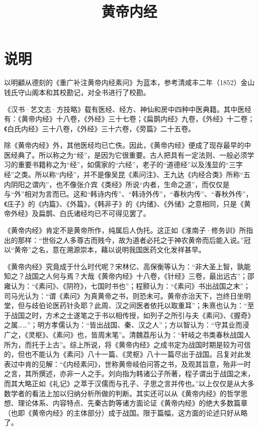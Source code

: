 \documentclass[a4paper,12pt,UTF8,twoside]{ctexbook}
\title{\heiti\zihao{0} 黄帝内经}
\date{}
\begin{document}
\maketitle

\tableofcontents

\frontmatter

\chapter{说明}
以明顧从德刻的《重广补注黄帝内经素问》为蓝本，参考清咸丰二年（1852）金山钱氏守山阁本和其校勘记，对全书进行了校勘。

《汉书·艺文志·方技略》载有医经、经方、神仙和房中四种中医典籍。其中医经有：《黄帝内经》十八卷，《外经》三十七卷；《扁鹊内经》九卷，《外经》十二卷；《白氏内经》三十八卷，《外经》三十六卷，《旁篇》二十五卷。

除《黄帝内经》外，其他医经均已亡佚。因此，《黄帝内经》便成了现存最早的中医经典了。所以称之为“经”，是因为它很重要。古人把具有一定法则、一般必须学习的重要书籍称之为“经”，如儒家的“六经”，老子的“道德经”以及浅显的“三字经”之类。所以称“内经”，并不是像吴昆《素问注》、王九达《内经合类》所称“五内阴阳之谓内”，也不像张介宾《类经》所说“内者，生命之道”，而仅仅是与“外”相对为言而已。这和“韩诗内传”、“韩诗外传”，“春秋内传”、“春秋外传”，《庄子》的《内篇》、《外篇》，《韩非子》的《内储》、《外储》之意相同，只是《黄帝外经》及扁鹊、白氏诸经均已不可得见罢了。

《黄帝内经》肯定不是黄帝所作，纯属后人伪托。这正如《淮南子·修务训》所指出的那样：“世俗之人多尊古而贱今，故为道者必托之于神农黄帝而后能入说。”冠以“黄帝”之名，意在溯源崇本，藉以说明我国医药文化发祥甚早。

《黄帝内经》究竟成于什么时代呢？宋林亿、高保衡等认为：“非大圣上智，孰能知之？战国之人何与焉？大哉《黄帝内经》十八卷，《针经》三卷，最出远古”；邵雍认为：“《素问》、《阴符》，七国时书也”；程颢认为：“《素问》书出战国之末”；司马光认为：“谓《素问》为真黄帝之书，则恐未可。黄帝亦治天下，岂终日坐明堂，但与歧伯论医药针灸耶？此周、汉之间医者依托以取重耳”；朱熹也认为：“至于战国之时，方术之士遂笔之于书以相传授，如列子之所引与夫《素问》、《握奇》之属……”；明方孝儒认为：“皆出战国、秦、汉之人”；方以智认为：“守其业而浸广之，《灵枢》、《素问》也，皆周末笔”。清魏荔彤认为：“轩岐之书类春秋战国人所为，而托于上古”。综上所说，将《黄帝内经》之成书定为战国时期是较为可信的，但也不能认为《素问》八十一篇、《灵枢》八十一篇尽出于战国。吕复对此发表过中肯的见解：“《内经素问》，世称黄帝岐伯问答之书，及观其旨意，殆非一时之言，其所撰述，亦非一人之手。刘向指为韩诸公子所著，程子谓出于战国之末，而其大略正如《礼记》之萃于汉儒而与孔子、子思之言并传也。”以上仅仅是从大多数学者的看法上加以归纳分析所做的判断。其实还可以从《黄帝内经》的哲学思想、理论体系、内容特点、先秦古韵等诸方面论证《黄帝内经》的绝大多数篇章（也即《黄帝内经》的主体部分）成于战国。限于篇幅，这方面的论述只好从略了。
\end{document}
